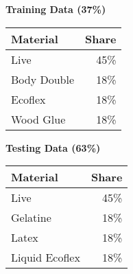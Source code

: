
    \begin{minipage}[r]{0.24\textwidth}
        \centering\textbf{Training Data (37\%)}
        
        \smallskip
        \begin{tabular}{ l r }
            Material    & Share \\ \hline
            Live        & 45\%  \\
            Body Double & 18\%  \\
            Ecoflex     & 18\%  \\
            Wood Glue   & 18\%
        \end{tabular}
    \end{minipage}
    \begin{minipage}[r]{0.24\textwidth}
        \centering\textbf{Testing Data (63\%)}
        
        \smallskip
        \begin{tabular}{ l r }
            Material        & Share \\ \hline
            Live            & 45\%  \\
            Gelatine        & 18\%  \\
            Latex           & 18\%  \\
            Liquid Ecoflex  & 18\%
        \end{tabular}
    \end{minipage}